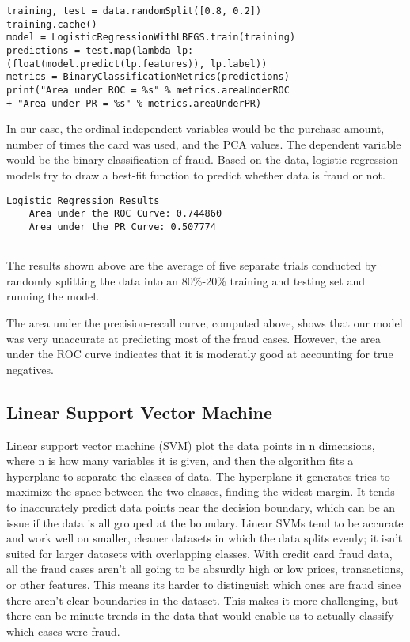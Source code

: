 \documentclass[9pt,twocolumn,twoside]{idsi}
\begin{document}
\begin{lstlisting}
training, test = data.randomSplit([0.8, 0.2])
training.cache()
model = LogisticRegressionWithLBFGS.train(training)
predictions = test.map(lambda lp:
(float(model.predict(lp.features)), lp.label))
metrics = BinaryClassificationMetrics(predictions)
print("Area under ROC = %s" % metrics.areaUnderROC 
+ "Area under PR = %s" % metrics.areaUnderPR)
\end{lstlisting}

In our case, the ordinal independent variables would be the purchase amount, number of times the card was used, and the PCA values. The dependent variable would be the binary classification of fraud. Based on the data, logistic regression models try to draw a best-fit function to predict whether data is fraud or not.

\begin{lstlisting}
Logistic Regression Results
	Area under the ROC Curve: 0.744860
	Area under the PR Curve: 0.507774
        
\end{lstlisting}

The results shown above are the average of five separate trials conducted by randomly splitting the data into an 80\%-20\% training and testing set and running the model.  


The 	 area under the precision-recall curve, computed above, shows that our model was very unaccurate at predicting most of the fraud cases. However, the area under the ROC curve indicates that it is moderatly good at accounting for true negatives.


\subsection{Linear Support Vector Machine}
Linear support vector machine (SVM) plot the data points in n dimensions, where n is how many variables it is given, and then the algorithm fits a hyperplane to separate the classes of data. The hyperplane it generates tries to maximize the space between the two classes, finding the widest margin. It tends to inaccurately predict data points near the decision boundary, which can be an issue if the data is all grouped at the boundary. 
Linear SVMs tend to be accurate and work well on smaller, cleaner datasets in which the data splits evenly; it isn't suited for larger datasets with overlapping classes. With credit card fraud data, all the fraud cases aren't all going to be absurdly high or low prices, transactions, or other features. This means its harder to distinguish which ones are fraud since there aren't clear boundaries in the dataset. This makes it more challenging, but there can be minute trends in the data that would enable us to actually classify which cases were fraud. 
\end{document}
